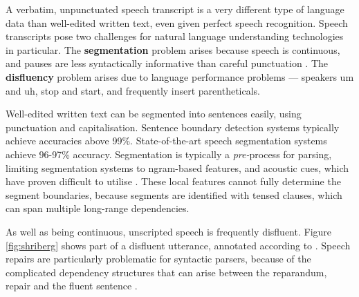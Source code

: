 \documentclass[11pt,letterpaper]{article}
\begin{document}
A verbatim, unpunctuated speech transcript is
a very different type of language data than well-edited written text, even
given perfect speech recognition.  Speech transcripts pose
two challenges for natural language understanding technologies in particular.
The \textbf{segmentation} problem arises because speech is continuous, and 
pauses are less syntactically informative than careful punctuation \citep{gregory:04}.
The \textbf{disfluency} problem arises due to language performance problems ---
speakers um and uh, stop and start, and frequently insert parentheticals.


Well-edited written text can be segmented into sentences easily, using punctuation and
capitalisation.  Sentence boundary detection systems typically achieve accuracies
above 99\%.  State-of-the-art speech segmentation systems achieve 96-97\% accuracy.
Segmentation is typically a \emph{pre-}process for parsing, limiting segmentation
systems to ngram-based features, and acoustic cues, which have proven difficult
to utilise \citep{liu:05}.  These local features cannot fully determine the segment
boundaries, because
segments are identified with tensed clauses, which can span multiple long-range dependencies.  

As well as being continuous, unscripted speech is frequently disfluent.
Figure \ref{fig:shriberg} shows part of a disfluent utterance, annotated according to
\citet{shriberg:94}.
Speech repairs are particularly problematic for syntactic
parsers, because of the complicated dependency structures that can arise between the
reparandum, repair and the fluent sentence \citep{Johnson04a}.
\end{document}

